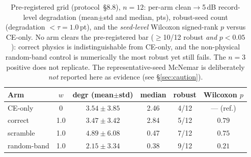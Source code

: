 \begin{table}[t]
  \centering
  \caption{Pre-registered grid (protocol~\S8.8), $n{=}12$: per-arm clean$\rightarrow$5\,dB
    record-level degradation (mean$\pm$std and median, pts), robust-seed count
    (degradation $<\tau=1.0$\,pt), and the \emph{seed-level} Wilcoxon
    signed-rank $p$ versus CE-only. No arm clears the pre-registered bar
    ($\ge$10/12 robust \emph{and} $p<0.05$): correct physics is
    indistinguishable from CE-only, and the non-physical random-band control is
    numerically the most robust yet still fails. The $n{=}3$ positive does not
    replicate. The representative-seed McNemar is deliberately \emph{not}
    reported here as evidence (see \S\ref{sec:caution}).}
  \label{tab:grid}
  \begin{tabular}{lccccc}
    \toprule
    Arm & $w$ & degr (mean$\pm$std) & median & robust & Wilcoxon $p$ \\
    \midrule
    CE-only        & 0   & $3.54 \pm 3.85$ & 2.46 & 4/12 & --- (ref.) \\
    correct        & 1.0 & $3.47 \pm 3.42$ & 2.84 & 5/12 & $0.79$ \\
    scramble       & 1.0 & $4.89 \pm 6.08$ & 0.47 & 7/12 & $0.75$ \\
    random-band    & 1.0 & $2.15 \pm 3.34$ & 0.38 & 9/12 & $0.21$ \\
    \bottomrule
  \end{tabular}
\end{table}
